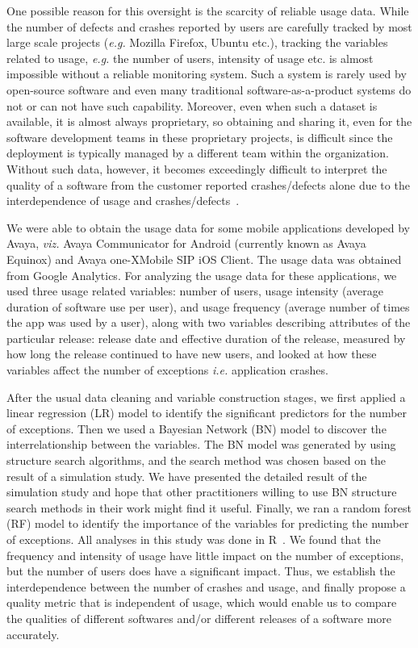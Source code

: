 \documentclass[smallextended]{svjour3}       %
\begin{document}
One possible reason for this oversight is the scarcity of reliable usage data. While the number of defects and crashes reported by users are carefully tracked by most large scale projects (\textit{e.g.} Mozilla Firefox, Ubuntu etc.), tracking the variables related to usage, \textit{e.g.} the number of users, intensity of usage etc. is almost impossible without a reliable monitoring system. Such a system is rarely used by open-source software and even many traditional software-as-a-product systems do not or can not have such capability. Moreover, even when such a dataset is available, it is almost always proprietary, so obtaining and sharing it, even for the software development teams in these proprietary projects, is difficult since the deployment is typically managed by a different team within the organization. Without such data, however, it becomes exceedingly difficult to interpret the quality of a software from the customer reported crashes/defects alone due to the interdependence of usage and crashes/defects~\cite{dey2018modeling,hmps15,IQ08}.

We were able to obtain the usage data for some mobile applications developed by Avaya, \textit{viz.}  Avaya Communicator for Android (currently known as Avaya Equinox\textregistered) and Avaya one-X\textregistered  Mobile SIP iOS Client. The usage data was obtained from Google Analytics. 
For analyzing the usage data for these applications, we used three usage related variables: number of users, 
usage intensity (average duration of software use per user), and usage frequency 
(average number of times the app was used by a user), along with two variables describing attributes 
of the particular release: release date and effective duration of the release, measured by how 
long the release continued to have new users, and looked at how these variables affect 
the number of exceptions \textit{i.e.} application crashes.  

After the usual data cleaning and variable construction stages, we first applied a linear regression (LR) model to identify the significant predictors for the number of exceptions. Then we used a Bayesian Network (BN) model to discover the interrelationship between the variables. The BN model was generated by using structure search algorithms, and the search method was chosen based on the result of a simulation study. We have presented the detailed result of the simulation study and hope that other practitioners willing to use BN structure search methods in their work might find it useful.  Finally, we ran a random forest (RF) model to identify the importance of the variables for predicting the number of exceptions. All analyses in this study was done in R~\cite{R}. We found that the frequency and intensity of usage have little impact on the number of exceptions, but the number of users does have a significant impact. Thus, we establish the interdependence between the number of crashes and usage, and finally propose a quality metric that is independent of usage, which would enable us to compare the qualities of different softwares and/or different releases of a software more accurately. 
\end{document}
